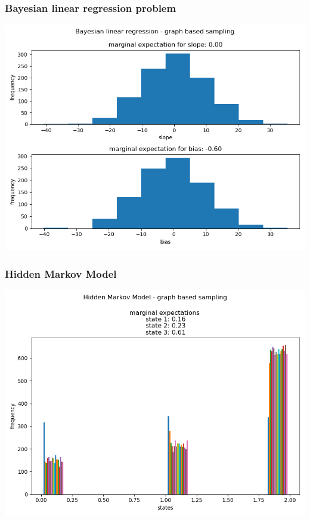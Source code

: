 \documentclass[10pt]{homeworg}
\begin{document}
\subsubsection{Bayesian linear regression problem}
\begin{center}
\includegraphics[scale=0.5]{figures/graph_2}
\end{center}

\subsubsection{Hidden Markov Model}
\begin{center}
\includegraphics[scale=0.5]{figures/graph_3}
\end{center}
\end{document}
